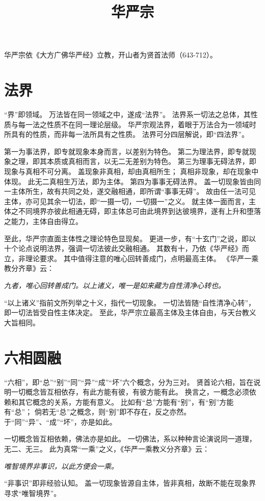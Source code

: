 \documentclass[11pt]{article}
\title{华严宗}
\date{}
\begin{document}
  \maketitle

  \linenumbers

华严宗依《大方广佛华严经》立教，开山者为贤首法师（643-712）。

\section{法界}
“界”即领域。
万法皆在同一领域之中，遂成“法界”。
法界系一切法之总体，其性质与每一法之性质不在同一理论层级。
华严宗观法界，着眼于万法合为一领域时所具有的性质，而非每一法所具有之性质。
法界可分四层解说，即“四法界”。

\par

第一为事法界，即专就现象本身而言，以差别为特色。
第二为理法界，即专就现象之理，即其本质或真相而言，以无二无差别为特色。
第三为理事无碍法界，即现象与真相不可分离。
盖现象非真相，却由真相所生；
真相非现象，却在现象中体现。
此无二真相生万法，即为主体。
第四为事事无碍法界。
盖一切现象皆由同一主体所生，故有共同之处，遂交融相通，即所谓“事事无碍”。
故由任一法可见主体，亦可见其余一切法，即“一摄一切，一切摄一”之义。
就主体一面而言，主体之不同境界亦彼此相通无碍，即主体总可由此境界到达彼境界，遂有上升和堕落之能力，主体自由得立。

\par

至此，华严宗直面主体性之理论特色显现矣。
更进一步，有“十玄门”之说，即以十个论点说明法界，强调一切法彼此交融相通。
其数有十，乃依《华严经》而立，非理论要求。
其中值得注意的唯心回转善成门，点明最高主体。
《华严一乘教分齐章》云：

\textit{九者，唯心回转善成门。以上诸义，唯一是如来藏为自性清净心转也。}

“以上诸义”指前文所列举之十义，指代一切现象。
一切法皆随“自性清净心转”，即一切法皆受自性主体决定。
至此，华严宗立最高主体及主体自由，与天台教义大旨相同。

\section{六相圆融}
“六相”，即“总”“别”“同”“异”“成”“坏”六个概念，分为三对。
贤首论六相，旨在说明一切概念皆互相依存，有此方能有彼，有彼方能有此。
换言之，一概念必须依赖和其它概念的关系，方能有意义。
比如有“总”方能有“别”，有“别”方能有“总”；
倘若无“总”之概念，则“别”即不存在，反之亦然。
于“同”“异”、“成”“坏”，亦是如此。

\par

一切概念皆互相依赖，佛法亦是如此。
一切佛法，系以种种言论演说同一道理，无二、无三。
此为真常“一乘”之义，《华严一乘教义分齐章》云：

\textit{唯智境界非事识，以此方便会一乘。}

“非事识”即非经验认知。
盖一切现象皆源自主体，皆非真相，故断不能在现象界寻求“唯智境界”。  
  
\end{document}
